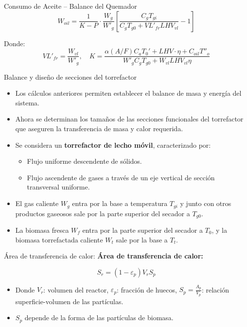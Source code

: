 \documentclass[main.tex]{subfiles}
\begin{document}
\begin{frame}{Consumo de Aceite – Balance del Quemador}
  \[
    W_{oil} = \frac{1}{K - P} \cdot \frac{W_g}{W'_g} \left[\frac{C_g T_{gi}}{C_g T_{g0} + VL'_{fr} LHV_{vl}}-1\right]
  \]

  Donde:
  \[
    VL'_{fr} = \frac{W_{vl}}{W'_g}, \quad K = \frac{\alpha (A/F) C_a T_0' + LHV \cdot \eta + C_{oil} T''_o} {W'_g C_g T_{g0} + W_{vl} LHV_{vl} \eta}
  \]
\end{frame}

\begin{frame}{Balance y diseño de secciones del torrefactor}
\small
\begin{itemize}
    \item Los cálculos anteriores permiten establecer el balance de masa y energía del sistema.
    \item Ahora se determinan los tamaños de las secciones funcionales del torrefactor que aseguren la transferencia de masa y calor requerida.
    \item Se considera un \textbf{torrefactor de lecho móvil}, caracterizado por:
    \begin{itemize}
        \item Flujo uniforme descendente de sólidos.
        \item Flujo ascendente de gases a través de un eje vertical de sección transversal uniforme.
    \end{itemize}
    \item El gas caliente \( W_g \) entra por la base a temperatura \( T_{gi} \) y junto con otros productos gaseosos sale por la parte superior del secador a \( T_{g0} \).
    \item La biomasa fresca \( W_f \) entra por la parte superior del secador a \( T_0 \), y la biomasa torrefactada caliente \( W_t \) sale por la base a \( T_t \).
\end{itemize}
\end{frame}
\begin{frame}{Área de transferencia de calor:}
    \textbf{Área de transferencia de calor:}

\[
S_r = (1 - \varepsilon_p) V_r S_p 
\]

\begin{itemize}
    \item Donde \( V_r \): volumen del reactor, \( \varepsilon_p \): fracción de huecos, \( S_p = \frac{A_p}{V_p} \): relación superficie-volumen de las partículas.
    \item \( S_p \) depende de la forma de las partículas de biomasa.
\end{itemize}
\end{frame}
\end{document}
